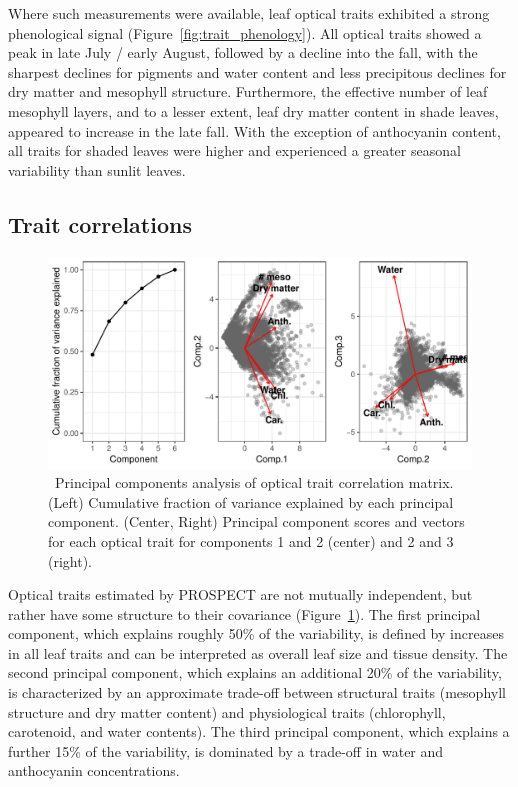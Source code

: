 Where such measurements were available, leaf optical traits exhibited a strong phenological signal (Figure~\ref{fig:trait_phenology}).
All optical traits showed a peak in late July / early August, followed by a decline into the fall, with the sharpest declines for pigments and water content and less precipitous declines for dry matter and mesophyll structure.
Furthermore, the effective number of leaf mesophyll layers, and to a lesser extent, leaf dry matter content in shade leaves, appeared to increase in the late fall.
With the exception of anthocyanin content, all traits for shaded leaves were higher and experienced a greater seasonal variability than sunlit leaves.

\subsection{Trait correlations}

\begin{figure}
  \includegraphics[width=\textwidth]{figures/prospect_pca.pdf}
  \caption{\
    Principal components analysis of optical trait correlation matrix. 
    (Left) Cumulative fraction of variance explained by each principal component.
    (Center, Right) Principal component scores and vectors for each optical trait for components 1 and 2 (center) and 2 and 3 (right).
  }\label{fig:prospect_pca}
\end{figure}

Optical traits estimated by PROSPECT are not mutually independent, but rather have some structure to their covariance (Figure~\ref{fig:prospect_pca}).
The first principal component, which explains roughly 50\% of the variability, is defined by increases in all leaf traits and can be interpreted as overall leaf size and tissue density.
The second principal component, which explains an additional 20\% of the variability, is characterized by an approximate trade-off between structural traits (mesophyll structure and dry matter content) and physiological traits (chlorophyll, carotenoid, and water contents).
The third principal component, which explains a further 15\% of the variability, is dominated by a trade-off in water and anthocyanin concentrations.

